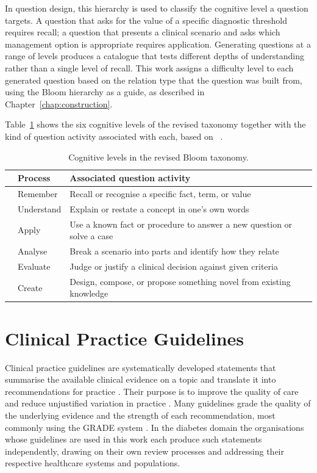 In question design, this hierarchy is used to classify the cognitive level a
question targets. A question that asks for the value of a specific diagnostic
threshold requires recall; a question that presents a clinical scenario and
asks which management option is appropriate requires application. Generating
questions at a range of levels produces a catalogue that tests different
depths of understanding rather than a single level of recall. This work
assigns a difficulty level to each generated question based on the relation
type that the question was built from, using the Bloom hierarchy as a guide,
as described in Chapter~\ref{chap:construction}.

Table~\ref{tab:bloom} shows the six cognitive levels of the revised taxonomy
together with the kind of question activity associated with each, based on
~\cite{anderson2001}.

\begin{table}[htbp]
\centering
\small\setlength{\tabcolsep}{5pt}
\begin{tabular}{p{0.5cm} p{2.2cm} p{7.8cm}}
\hline
& \textbf{Process} & \textbf{Associated question activity} \\
\hline
& Remember    & Recall or recognise a specific fact, term, or value \\[3pt]
& Understand  & Explain or restate a concept in one's own words \\[3pt]
& Apply       & Use a known fact or procedure to answer a new question or solve a case \\[3pt]
& Analyse     & Break a scenario into parts and identify how they relate \\[3pt]
& Evaluate    & Judge or justify a clinical decision against given criteria \\[3pt]
& Create      & Design, compose, or propose something novel from existing knowledge \\
\hline
\end{tabular}
\caption{Cognitive levels in the revised Bloom taxonomy.}
\label{tab:bloom}
\end{table}

\section{Clinical Practice Guidelines}
\label{sec:bg-guidelines}

Clinical practice guidelines are systematically developed statements that
summarise the available clinical evidence on a topic and translate it into
recommendations for practice \cite{nyameino2020}. Their purpose is to improve
the quality of care and reduce unjustified variation in practice
\cite{peleg2013}. Many guidelines grade the quality of the underlying evidence
and the strength of each recommendation, most commonly using the GRADE system
\cite{guyatt2011}. In the diabetes domain
the organisations whose guidelines are used in this work each produce such
statements independently, drawing on their own review processes and addressing
their respective healthcare systems and populations.

